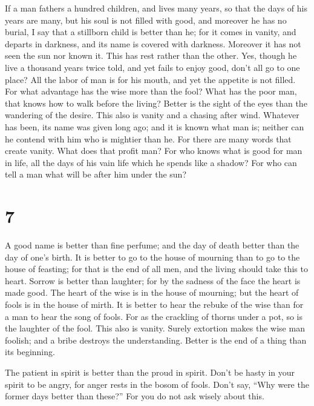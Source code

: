  If a man fathers a hundred children, and lives many
years, so that the days of his years are many, but his soul is not
filled with good, and moreover he has no burial, I say that a stillborn
child is better than he;  for it comes in vanity, and
departs in darkness, and its name is covered with darkness.
 Moreover it has not seen the sun nor known it. This has
rest rather than the other.  Yes, though he live a
thousand years twice told, and yet fails to enjoy good, don't all go to
one place?  All the labor of man is for his mouth, and yet
the appetite is not filled.  For what advantage has the
wise more than the fool? What has the poor man, that knows how to walk
before the living?  Better is the sight of the eyes than
the wandering of the desire. This also is vanity and a chasing after
wind.  Whatever has been, its name was given long ago;
and it is known what man is; neither can he contend with him who is
mightier than he.  For there are many words that create
vanity. What does that profit man?  For who knows what is
good for man in life, all the days of his vain life which he spends like
a shadow? For who can tell a man what will be after him under the sun?

\hypertarget{section-6}{%
\section{7}\label{section-6}}

 A good name is better than fine perfume; and the day of
death better than the day of one's birth.  It is better to
go to the house of mourning than to go to the house of feasting; for
that is the end of all men, and the living should take this to heart.
 Sorrow is better than laughter; for by the sadness of the
face the heart is made good.  The heart of the wise is in
the house of mourning; but the heart of fools is in the house of mirth.
 It is better to hear the rebuke of the wise than for a
man to hear the song of fools.  For as the crackling of
thorns under a pot, so is the laughter of the fool. This also is vanity.
 Surely extortion makes the wise man foolish; and a bribe
destroys the understanding.  Better is the end of a thing
than its beginning.

The patient in spirit is better than the proud in spirit. 
Don't be hasty in your spirit to be angry, for anger rests in the bosom
of fools.  Don't say, ``Why were the former days better
than these?'' For you do not ask wisely about this.

